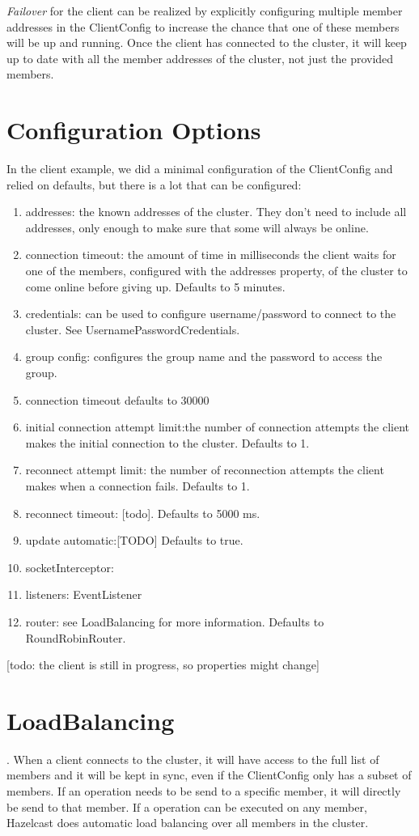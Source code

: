 \emph{Failover} for the client can be realized by explicitly configuring multiple member addresses in the ClientConfig to increase the chance that one of these members will be up and running. Once the client has connected to the cluster, it will keep up to date with all the member addresses of the cluster, not just the provided members.

\section{Configuration Options}
In the client example, we did a minimal configuration of the ClientConfig and relied on defaults, but there is a lot that can be configured:
\begin{enumerate}
\item addresses: the known addresses of the cluster. They don't need to include all addresses, only enough to make sure that some will always be online.
\item connection timeout: the amount of time in milliseconds the client waits for one of the members, configured with the addresses property, of the cluster to come online before giving up. Defaults to 5 minutes.
\item credentials: can be used to configure username/password to connect to the cluster. See UsernamePasswordCredentials.
\item group config: configures the group name and the password to access the group.
\item connection timeout defaults to 30000
\item initial connection attempt limit:the  number of connection attempts the client makes the initial connection to the cluster. Defaults to 1.
\item reconnect attempt limit: the number of reconnection attempts the client makes when a connection fails. Defaults to 1.
\item reconnect timeout: [todo]. Defaults to 5000 ms.
\item update automatic:[TODO] Defaults to true.
\item socketInterceptor:
\item listeners: EventListener
\item router: see LoadBalancing for more information. Defaults to RoundRobinRouter.
\end{enumerate}
[todo: the client is still in progress, so properties might change]

\section{LoadBalancing}.
When a client connects to the cluster, it will have access to the full list of members and it will be kept in sync, even if the ClientConfig only has a subset of members. If an operation needs to be send to a specific member, it will directly be send to that member. If a operation can be executed on any member, Hazelcast does automatic load balancing over all members in the cluster. 

